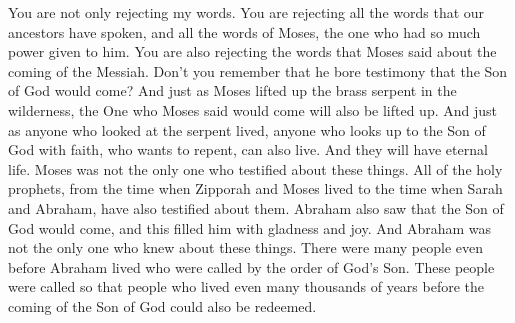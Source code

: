 \bverse \iffalse But, behold, ye not only deny my words, but ye also deny all the words which have been spoken by our fathers, and also the words which were spoken by this man, Moses, who had such great power given unto him, yea, the words which he hath spoken concerning the coming of the Messiah. \fi
You are not only rejecting my words. You are rejecting all the words that our ancestors have spoken, and all the words of Moses, the one who had so much power given to him. You are also rejecting the words that Moses said about the coming of the Messiah.
\bverse \iffalse Yea, did he not bear record that the Son of God should come?  And as he lifted up the brazen serpent in the wilderness, even so shall he be lifted up who should come. \fi
Don't you remember that he bore testimony that the Son of God would come? And just as Moses lifted up the brass serpent in the wilderness, the One who Moses said would come will also be lifted up.
\bverse \iffalse And as many as should look upon that serpent should live, even so as many as should look upon the Son of God with faith, having a contrite spirit, might live, even unto that life which is eternal. \fi
And just as anyone who looked at the serpent lived, anyone who looks up to the Son of God with faith, who wants to repent, can also live. And they will have eternal life.
\bverse \iffalse And now behold, Moses did not only testify of these things, but also all the holy prophets, from his days even to the days of Abraham. \fi
Moses was not the only one who testified about these things. All of the holy prophets, from the time when Zipporah and Moses lived to the time when Sarah and Abraham, have also testified about them.
\bverse \iffalse Yea, and behold, Abraham saw of his coming, and was filled with gladness and did rejoice. \fi
Abraham also saw that the Son of God would come, and this filled him with gladness and joy.
\bverse \iffalse Yea, and behold I say unto you, that Abraham not only knew of these things, but there were many before the days of Abraham who were called by the order of God; yea, even after the order of his Son; and this that it should be shown unto the people, a great many thousand years before his coming, that even redemption should come unto them. \fi
And Abraham was not the only one who knew about these things. There were many people even before Abraham lived who were called by the order of God's Son. These people were called so that people who lived even many thousands of years before the coming of the Son of God could also be redeemed.
